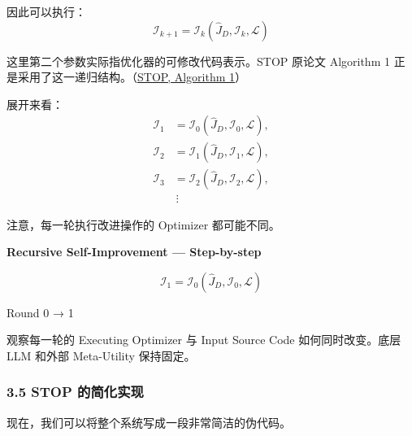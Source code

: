 因此可以执行：
\[\boxed{
\mathcal I_{k+1}
=
\mathcal I_k
\left(
\widehat J_D,
\mathcal I_k,
\mathcal L
\right)
}\]

这里第二个参数实际指优化器的可修改代码表示。STOP 原论文 Algorithm 1 正是采用了这一递归结构。（\href{https://xychen5.github.io/papers/originals/2310.02304-self-taught-optimizer.pdf#page=5}{STOP, Algorithm 1}）

展开来看：
\[\begin{aligned}
\mathcal I_1
&=\mathcal I_0(\widehat J_D,\mathcal I_0,\mathcal L),\\
\mathcal I_2
&=\mathcal I_1(\widehat J_D,\mathcal I_1,\mathcal L),\\
\mathcal I_3
&=\mathcal I_2(\widehat J_D,\mathcal I_2,\mathcal L),\\
&\ \vdots
\end{aligned}\]

注意，每一轮执行改进操作的 Optimizer 都可能不同。

\textbf{Recursive Self-Improvement --- Step-by-step}


\[\mathcal I_{1}=\mathcal I_{0}(\widehat J_D,\mathcal I_{0},\mathcal L)\]

Round 0 → 1

观察每一轮的 Executing Optimizer 与 Input Source Code 如何同时改变。底层 LLM 和外部 Meta-Utility 保持固定。

\hypertarget{part-3-37-0001-stop-ux7684ux7b80ux5316ux5b9eux73b0}{%
\subsubsection{3.5 STOP 的简化实现}\label{part-3-37-0001-stop-ux7684ux7b80ux5316ux5b9eux73b0}}

现在，我们可以将整个系统写成一段非常简洁的伪代码。

